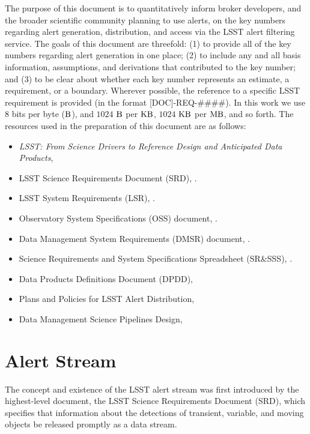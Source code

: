 \documentclass[DM,authoryear,toc]{lsstdoc}
\begin{document}
The purpose of this document is to quantitatively inform broker developers, and the broader scientific community planning to use alerts, on the key numbers regarding alert generation, distribution, and access via the LSST alert filtering service. The goals of this document are threefold: (1) to provide all of the key numbers regarding alert generation in one place; (2) to include any and all basis information, assumptions, and derivations that contributed to the key number; and (3) to be clear about whether each key number represents an estimate, a requirement, or a boundary. Wherever possible, the reference to a specific LSST requirement is provided (in the format [DOC]-REQ-\#\#\#\#). In this work we use 8 bits per byte ($\rm B$), and $1024$ $\rm B$ per $\rm KB$, $1024$ $\rm KB$ per $\rm MB$, and so forth. The resources used in the preparation of this document are as follows:
\begin{itemize}
\item {\it LSST: From Science Drivers to Reference Design and Anticipated Data Products}, \citet{2008arXiv0805.2366I}
\item LSST Science Requirements Document (SRD), .
\item LSST System Requirements (LSR), .
\item Observatory System Specifications (OSS) document, .
\item Data Management System Requirements (DMSR) document, .
\item Science Requirements and System Specifications Spreadsheet (SR\&SSS), .
\item Data Products Definitions Document (DPDD), 
\item Plans and Policies for LSST Alert Distribution, 
\item Data Management Science Pipelines Design, 
\end{itemize}

\section{Alert Stream} \label{sec:alerts}

The concept and existence of the LSST alert stream was first introduced by the highest-level document, the LSST Science Requirements Document (SRD), which specifies that information about the detections of transient, variable, and moving objects be released promptly as a data stream. 
\end{document}
